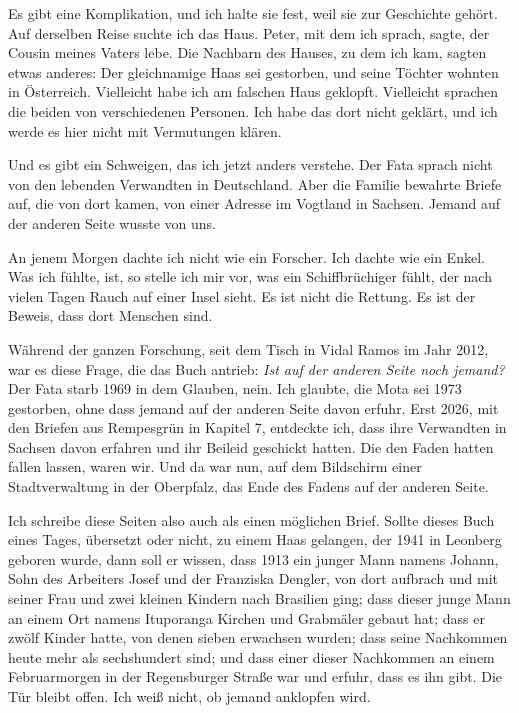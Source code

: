 \documentclass[
  ngerman,
  11pt,
  openany]{book}
\begin{document}
Es gibt eine Komplikation, und ich halte sie fest, weil sie zur
Geschichte gehört. Auf derselben Reise suchte ich das Haus. Peter, mit
dem ich sprach, sagte, der Cousin meines Vaters lebe. Die Nachbarn des
Hauses, zu dem ich kam, sagten etwas anderes: Der gleichnamige Haas sei
gestorben, und seine Töchter wohnten in Österreich. Vielleicht habe ich
am falschen Haus geklopft. Vielleicht sprachen die beiden von
verschiedenen Personen. Ich habe das dort nicht geklärt, und ich werde
es hier nicht mit Vermutungen klären.

Und es gibt ein Schweigen, das ich jetzt anders verstehe. Der Fata
sprach nicht von den lebenden Verwandten in Deutschland. Aber die
Familie bewahrte Briefe auf, die von dort kamen, von einer Adresse im
Vogtland in Sachsen. Jemand auf der anderen Seite wusste von uns.

An jenem Morgen dachte ich nicht wie ein Forscher. Ich dachte wie ein
Enkel. Was ich fühlte, ist, so stelle ich mir vor, was ein
Schiffbrüchiger fühlt, der nach vielen Tagen Rauch auf einer Insel
sieht. Es ist nicht die Rettung. Es ist der Beweis, dass dort Menschen
sind.

Während der ganzen Forschung, seit dem Tisch in Vidal Ramos im Jahr
2012, war es diese Frage, die das Buch antrieb: \emph{Ist auf der
anderen Seite noch jemand?} Der Fata starb 1969 in dem Glauben, nein.
Ich glaubte, die Mota sei 1973 gestorben, ohne dass jemand auf der
anderen Seite davon erfuhr. Erst 2026, mit den Briefen aus Rempesgrün in
Kapitel 7, entdeckte ich, dass ihre Verwandten in Sachsen davon erfahren
und ihr Beileid geschickt hatten. Die den Faden hatten fallen lassen,
waren wir. Und da war nun, auf dem Bildschirm einer Stadtverwaltung in
der Oberpfalz, das Ende des Fadens auf der anderen Seite.

Ich schreibe diese Seiten also auch als einen möglichen Brief. Sollte
dieses Buch eines Tages, übersetzt oder nicht, zu einem Haas gelangen,
der 1941 in Leonberg geboren wurde, dann soll er wissen, dass 1913 ein
junger Mann namens Johann, Sohn des Arbeiters Josef und der Franziska
Dengler, von dort aufbrach und mit seiner Frau und zwei kleinen Kindern
nach Brasilien ging; dass dieser junge Mann an einem Ort namens
Ituporanga Kirchen und Grabmäler gebaut hat; dass er zwölf Kinder hatte,
von denen sieben erwachsen wurden; dass seine Nachkommen heute mehr als
sechshundert sind; und dass einer dieser Nachkommen an einem
Februarmorgen in der Regensburger Straße war und erfuhr, dass es ihn
gibt. Die Tür bleibt offen. Ich weiß nicht, ob jemand anklopfen wird.
\end{document}
